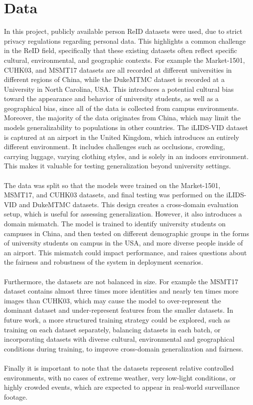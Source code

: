 \section{Data}
In this project, publicly available person \acs{ReID} datasets were used, due to strict privacy regulations regarding personal data. This highlights a common challenge in the \acs{ReID} field, specifically that these existing datasets often reflect specific cultural, environmental, and geographic contexts. For example the Market-1501, \acs{CUHK03}, and \acs{MSMT17} datasets are all recorded at different universities in different regions of China, while the \acs{DukeMTMC} dataset is recorded at a University in North Carolina, USA. This introduces a potential cultural bias toward the appearance and behavior of university students, as well as a geographical bias, since all of the data is collected from campus environments. Moreover, the majority of the data originates from China, which may limit the models generalizability to populations in other countries. The \acs{iLIDS-VID} dataset is captured at an airport in the United Kingdom, which introduces an entirely different environment. It includes challenges such as occlusions, crowding, carrying luggage, varying clothing styles, and is solely in an indoors environment. This makes it valuable for testing generalization beyond university settings. 
\\\\
The data was split so that the models were trained on the Market-1501, \acs{MSMT17}, and \acs{CUHK03} datasets, and final testing was performed on the \acs{iLIDS-VID} and \acs{DukeMTMC} datasets. This design creates a cross-domain evaluation setup, which is useful for assessing generalization. However, it also introduces a domain mismatch. The model is trained to identify university students on campuses in China, and then tested on different demographic groups in the forms of university students on campus in the USA, and more diverse people inside of an airport. This mismatch could impact performance, and raises questions about the fairness and robustness of the system in deployment scenarios. 
\\\\
Furthermore, the datasets are not balanced in size. For example the \acs{MSMT17} dataset contains almost three times more identities and nearly ten times more images than \acs{CUHK03}, which may cause the model to over-represent the dominant dataset and under-represent features from the smaller datasets. In future work, a more structured training strategy could be explored, such as training on each dataset separately, balancing datasets in each batch, or incorporating datasets with diverse cultural, environmental and geographical conditions during training, to improve cross-domain generalization and fairness. 
\\\\
Finally it is important to note that the datasets represent relative controlled environments, with no cases of extreme weather, very low-light conditions, or highly crowded events, which are expected to appear in real-world surveillance footage. 

